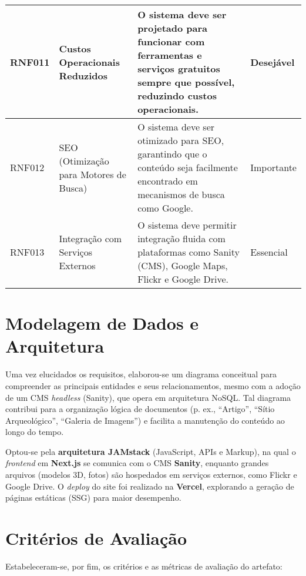 {\begin{longtable}{|>{\raggedright}p{2.5cm}|>{\raggedright}p{4cm}|p{6cm}|>{\raggedright}p{2cm}|}
\hline
RNF011 & Custos Operacionais Reduzidos & O sistema deve ser projetado para funcionar com ferramentas e serviços gratuitos sempre que possível, reduzindo custos operacionais. & Desejável \\
\hline
RNF012 & SEO (Otimização para Motores de Busca) & O sistema deve ser otimizado para SEO, garantindo que o conteúdo seja facilmente encontrado em mecanismos de busca como Google. & Importante \\
\hline
RNF013 & Integração com Serviços Externos & O sistema deve permitir integração fluida com plataformas como Sanity (CMS), Google Maps, Flickr e Google Drive. & Essencial \\
\hline
\end{longtable}
} %


\section{Modelagem de Dados e Arquitetura}
\label{sec:modelagem_arquitetura}

Uma vez elucidados os requisitos, elaborou-se um diagrama conceitual para compreender as principais entidades e seus relacionamentos, mesmo com a adoção de um CMS \textit{headless} (Sanity), que opera em arquitetura NoSQL. Tal diagrama contribui para a organização lógica de documentos (p. ex., “Artigo”, “Sítio Arqueológico”, “Galeria de Imagens”) e facilita a manutenção do conteúdo ao longo do tempo.

Optou-se pela \textbf{arquitetura JAMstack} (JavaScript, APIs e Markup), na qual o \textit{frontend} em \textbf{Next.js} se comunica com o CMS \textbf{Sanity}, enquanto grandes arquivos (modelos 3D, fotos) são hospedados em serviços externos, como Flickr e Google Drive. O \textit{deploy} do site foi realizado na \textbf{Vercel}, explorando a geração de páginas estáticas (SSG) para maior desempenho.

\section{Critérios de Avaliação}
\label{sec:criterios_avaliacao}

Estabeleceram-se, por fim, os critérios e as métricas de avaliação do artefato:

